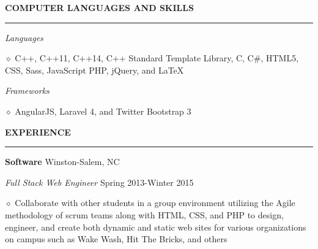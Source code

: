 \documentclass[executivepaper]{extarticle}
\begin{document}
\begin{center}
{\begin{minipage}{7.0in}
\vspace{-1mm}

{}

\vspace{3mm}


{\noindent \textbf{\fontsize{10}{9}\selectfont COMPUTER LANGUAGES AND SKILLS}}

\vspace{-3mm}

\noindent \rule{\textwidth}{0.5pt}

\vspace{-1mm}

{\noindent \textit{\fontsize{9}{8}\selectfont Languages}}

{\noindent $\diamond$ {\fontsize{9}{8}\selectfont C++, C++11, C++14, C++ Standard Template Library, C, C\#, HTML5, CSS, Sass, JavaScript PHP, jQuery, and \LaTeX}}

{\noindent \textit{\fontsize{9}{8}\selectfont Frameworks}}

{\noindent $\diamond$ {\fontsize{9}{8}\selectfont AngularJS, Laravel 4, and Twitter Bootstrap 3}}

\vspace{3mm}


{\noindent \textbf{\fontsize{10}{9}\selectfont EXPERIENCE}}

\vspace{-3mm}

\noindent \rule{\textwidth}{0.5pt}

\vspace{-1mm}

{\noindent \textbf{\fontsize{9}{8} Software}} {\hfill \fontsize{9}{8}\selectfont Winston-Salem, NC}

{\noindent \textit{\fontsize{9}{8}\selectfont Full Stack Web Engineer}} {\hfill \fontsize{9}{8}\selectfont Spring 2013-Winter 2015}

{\noindent $\diamond$ {\fontsize{9}{8}\selectfont Collaborate with other students in a group environment utilizing the Agile methodology of scrum teams along with
HTML, CSS, and PHP to design, engineer, and create both dynamic and static web sites for various organizations on campus such as Wake Wash, Hit The Bricks, and others}}


\end{minipage}}
\end{center}
\end{document}
